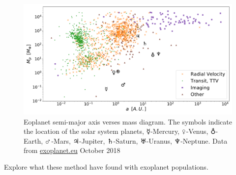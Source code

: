 %



\begin{figure}
    \centering
    \includegraphics[width=0.\linewidth]{./figures/introduction/exoplanetEU_a_mass.pdf}
    \caption{Eoplanet semi-major axis verses mass diagram.
        The symbols indicate the location of the solar system planets, $\mercury$-Mercury, $\venus$-Venus, $\earth$-Earth, $\mars$-Mars, $\jupiter$-Jupiter, $\saturn$-Saturn, $\uranus$-Uranus, $\neptune$-Neptune.
        Data from \href{http://ww.exoplanet.eu}{exoplanet.eu} October 2018}
    \label{fig:pltoverlayadd}
\end{figure}


Explore what these method have found with exoplanet populations.
